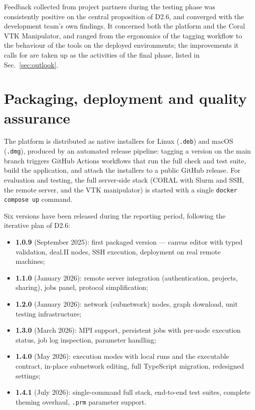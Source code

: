 \documentclass[a4paper,12pt]{article}
\begin{document}
Feedback collected from project partners during the testing phase was
consistently positive on the central proposition of D2.6, and converged with
the development team's own findings. It concerned both the platform and the
Coral VTK Manipulator, and ranged from the ergonomics of the tagging workflow
to the behaviour of the tools on the deployed environments; the improvements
it calls for are taken up as the activities of the final phase, listed in
Sec.~\ref{sec:outlook}.

\FloatBarrier

\section{\textcolor{EUblue}{Packaging, deployment and quality assurance}}

The platform is distributed as native installers for Linux
(\texttt{.deb}) and macOS (\texttt{.dmg}), produced by an automated release
pipeline: tagging a version on the main branch triggers GitHub Actions
workflows that run the full check and test suite, build the application, and
attach the installers to a public GitHub release. For evaluation and
testing, the full server-side stack (CORAL with Slurm and SSH, the remote
server, and the VTK manipulator) is started with a single
\texttt{docker compose up} command.

Six versions have been released during the reporting period, following the
iterative plan of D2.6:

\begin{itemize}
    \item \textbf{1.0.9} (September 2025): first packaged version --- canvas
        editor with typed validation, deal.II nodes, SSH execution, deployment on real remote machines;
    \item \textbf{1.1.0} (January 2026): remote server integration
        (authentication, projects, sharing), jobs panel, protocol
        simplification;
    \item \textbf{1.2.0} (January 2026): network (subnetwork) nodes, graph
        download, unit testing infrastructure;
    \item \textbf{1.3.0} (March 2026): MPI support, persistent jobs with
        per-node execution status, job log inspection, parameter handling;
    \item \textbf{1.4.0} (May 2026): execution modes with local runs and the
        executable contract, in-place subnetwork editing, full TypeScript
        migration, redesigned settings;
    \item \textbf{1.4.1} (July 2026): single-command full stack, end-to-end test suites, complete theming
        overhaul, \texttt{.prm} parameter support.
\end{itemize}
\end{document}
